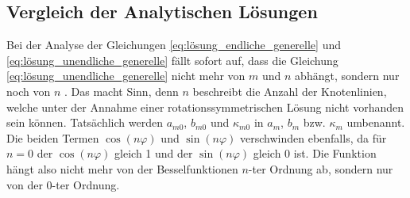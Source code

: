 \subsection{Vergleich der Analytischen Lösungen
\label{kreismembran:vergleich}}
Bei der Analyse der Gleichungen \eqref{eq:lösung_endliche_generelle} und \eqref{eq:lösung_unendliche_generelle} fällt sofort auf, dass die Gleichung \eqref{eq:lösung_unendliche_generelle} nicht mehr von $m$ und $n$ abhängt, sondern nur noch von $n$ \cite{nishanth_p_vibrations_2018}. 
Das macht Sinn, denn $n$ beschreibt die Anzahl der Knotenlinien, welche unter der Annahme einer rotationssymmetrischen Lösung nicht vorhanden sein können. Tatsächlich werden $a_{m0}$, $b_{m0}$ und $\kappa_{m0}$ in $a_m$, $b_m$ bzw. $\kappa_m$ umbenannt. Die beiden Termen $\cos(n\varphi)$ und $\sin(n\varphi)$ verschwinden ebenfalls, da für $n=0$ der $\cos(n\varphi)$ gleich 1 und der $\sin(n \varphi)$ gleich 0 ist.
Die Funktion hängt also nicht mehr von der Besselfunktionen $n$-ter Ordnung ab, sondern nur von der $0$-ter Ordnung. 


